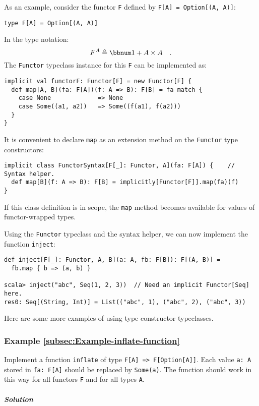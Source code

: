As an example, consider the functor \lstinline!F! defined by \lstinline!F[A] = Option[(A, A)]!:
\begin{lstlisting}
type F[A] = Option[(A, A)]
\end{lstlisting}
In the type notation: 
\[
F^{A}\triangleq\bbnum 1+A\times A\quad.
\]
The \lstinline!Functor! typeclass instance for this \lstinline!F!
can be implemented as:
\begin{lstlisting}
implicit val functorF: Functor[F] = new Functor[F] {
  def map[A, B](fa: F[A])(f: A => B): F[B] = fa match {
    case None             => None
    case Some((a1, a2))   => Some((f(a1), f(a2)))
  }
}
\end{lstlisting}

It is convenient to declare \lstinline!map! as an extension method
on the \lstinline!Functor! type constructors:
\begin{lstlisting}
implicit class FunctorSyntax[F[_]: Functor, A](fa: F[A]) {    // Syntax helper.
  def map[B](f: A => B): F[B] = implicitly[Functor[F]].map(fa)(f)
}
\end{lstlisting}
If this class definition is in scope, the \lstinline!map! method
becomes available for values of functor-wrapped types.

Using the \lstinline!Functor! typeclass and the syntax helper, we
can now implement the function \lstinline!inject!:
\begin{lstlisting}
def inject[F[_]: Functor, A, B](a: A, fb: F[B]): F[(A, B)] =
  fb.map { b => (a, b) }

scala> inject("abc", Seq(1, 2, 3))  // Need an implicit Functor[Seq] here.
res0: Seq[(String, Int)] = List(("abc", 1), ("abc", 2), ("abc", 3))
\end{lstlisting}

Here are some more examples of using type constructor typeclasses.

\subsubsection{Example \label{subsec:Example-inflate-function}\ref{subsec:Example-inflate-function}}

Implement a function \lstinline!inflate! of type \lstinline!F[A] => F[Option[A]]!.
Each value \lstinline!a: A! stored in \lstinline!fa: F[A]! should
be replaced by \lstinline!Some(a)!. The function should work in this
way for all functors \lstinline!F! and for all types \lstinline!A!.

\subparagraph{Solution}

